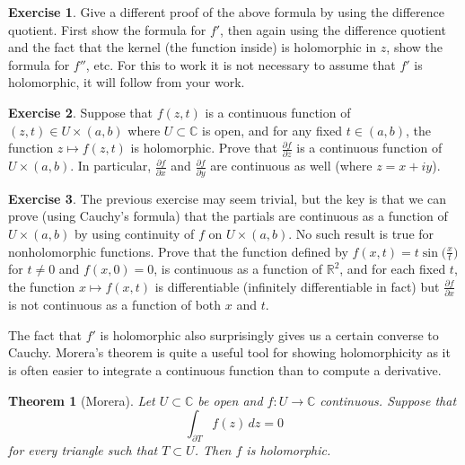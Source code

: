 \documentclass[12pt,openany]{book}
\newcommand{\C}{{\mathbb{C}}}
\newcommand{\R}{{\mathbb{R}}}
\theoremstyle{plain}
\newtheorem{thm}{Theorem}[section]
\theoremstyle{remark}
\theoremstyle{definition}
\newenvironment{exbox}{%
    \def\FrameCommand{\vrule width 1pt \relax\hspace {10pt}}%
    \MakeFramed {\advance \hsize -\width \FrameRestore }%
}{%
    \endMakeFramed
}
\theoremstyle{exercise}
\newtheorem{exercise}{Exercise}[section]
\theoremstyle{example}
\begin{document}
\begin{exbox}
\begin{exercise}
Give a different proof of the above formula by using the difference
quotient.  First show the formula for $f'$, then again using the difference
quotient and the fact that the kernel (the function inside) is holomorphic
in $z$, show the formula for $f''$, etc.  For this to work it is
not necessary to assume that $f'$ is holomorphic, it will follow from your
work.
\end{exercise}

\begin{exercise} \label{exercise:partialderscont}
Suppose that $f(z,t)$ is a continuous function of $(z,t) \in U \times (a,b)$
where $U \subset \C$ is open, and for any fixed $t \in (a,b)$, the function
$z \mapsto f(z,t)$ is holomorphic.  Prove that
$\frac{\partial f}{\partial z}$ is a continuous function of $U \times
(a,b)$.  In particular,
$\frac{\partial f}{\partial x}$
and
$\frac{\partial f}{\partial y}$ are continuous as well (where $z=x+iy$).
\end{exercise}

\begin{exercise}
The previous exercise may seem trivial, but the key is that we can prove
(using Cauchy's formula) that the partials are continuous as a function of
$U \times (a,b)$ by using continuity of $f$ on $U \times (a,b)$.  No such
result is true for nonholomorphic functions.  Prove that the function defined by
$f(x,t) = t \sin\bigl(\frac{x}{t}\bigr)$ for $t \not= 0$ and $f(x,0) =  0$,
is continuous as a function of $\R^2$, and for each fixed $t$, the function
$x \mapsto f(x,t)$ is differentiable (infinitely differentiable in fact)
but $\frac{\partial f}{\partial x}$ is not continuous as a function of both
$x$ and $t$.
\end{exercise}
\end{exbox}

The fact that $f'$ is holomorphic also surprisingly gives us a
certain converse to Cauchy.
Morera's theorem is quite a useful tool for showing
holomorphicity as it is often easier to integrate a continuous
function than to compute a derivative.

\begin{thm}[Morera]
%
\label{thm:Morera}%
Let $U \subset \C$ be open and $f \colon U \to \C$ continuous.
Suppose that
\begin{equation*}
\int_{\partial T} f(z) \, dz = 0
\end{equation*}
for every triangle such that $T \subset U$.  Then $f$ is holomorphic.
\end{thm}
\end{document}
